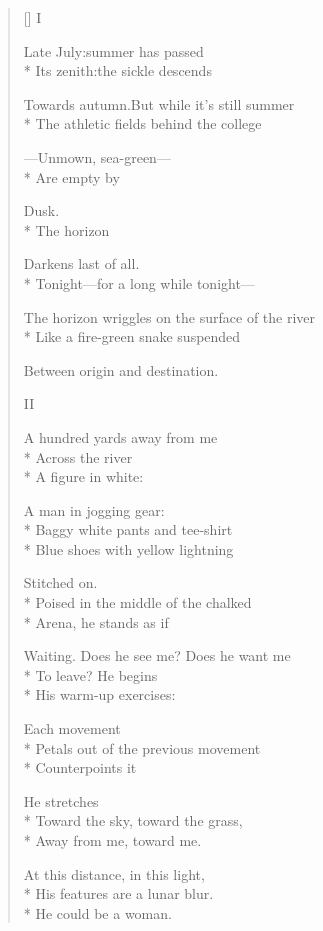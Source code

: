 \label{ch:azrael}
\settowidth{\versewidth}{So I will become the runner\ldots I will become the runner}
\begin{verse}[\versewidth]
\hspace{0.45\versewidth} I

Late July:\quad summer has passed\\*
Its zenith:\quad the sickle descends

Towards autumn.\quad But while it's still summer\\*
The athletic fields behind the college

---Unmown, sea-green---\\*
Are empty by 

Dusk. \\*
The horizon

Darkens last of all.\\*
Tonight---for a long while tonight---

The horizon wriggles on the surface of the river\\*
Like a fire-green snake suspended

Between origin and destination.

\hspace{0.45\versewidth} II

A hundred yards away from me\\*
Across the river\\*
A figure in white:

A man in jogging gear:\\*
Baggy white pants and tee-shirt\\*
Blue shoes with yellow lightning

Stitched on.\\*
Poised in the middle of the chalked \\*
Arena, he stands as if

Waiting.  Does he see me?  Does he want me\\*
To leave?  He begins\\*
His warm-up exercises:

Each movement\\*
Petals out of the previous movement\\*
Counterpoints it

He stretches\\*
Toward the sky, toward the grass,\\*
Away from me, toward me.

At this distance, in this light,\\*
His features are a lunar blur.\\*
He could be a woman.


\end{verse}
